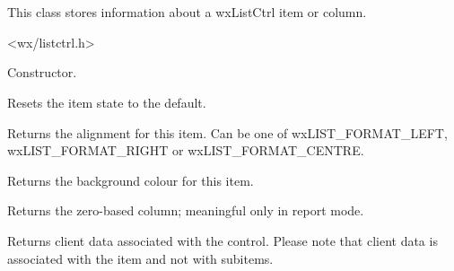 \section{}\label{wxlistitem}

This class stores information about a wxListCtrl item or column.




<wx/listctrl.h>


\label{wxlistitemwxlistitem}


Constructor.

\label{wxlistitemclear}


Resets the item state to the default.

\label{wxlistitemgetalign}


Returns the alignment for this item. Can be one of
wxLIST\_FORMAT\_LEFT, wxLIST\_FORMAT\_RIGHT or wxLIST\_FORMAT\_CENTRE.

\label{wxlistitemgetbackgroundcolour}


Returns the background colour for this item.

\label{wxlistitemgetcolumn}


Returns the zero-based column; meaningful only in report mode.

\label{wxlistitemgetdata}


Returns client data associated with the control. Please note that
client data is associated with the item and not with subitems.

\label{wxlistitemgetfont}


